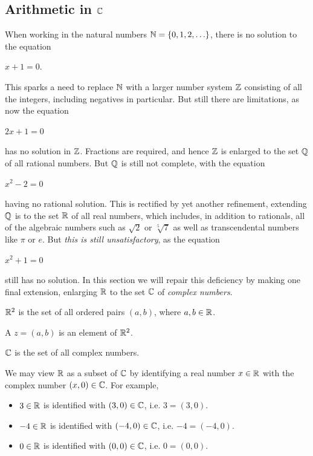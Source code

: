 \documentclass[11pt,fleqn,dvipsnames,usenames]{article}
\newcommand{\p}{\noindent}
\begin{document}
\subsection{Arithmetic in $\mathbb{C}$}

\p When working in the natural numbers $\mathbb{N} = \left\{0,1,2,\ldots\right\}$, there is no solution to the equation
\begin{center}
$x + 1 = 0$.
\end{center}
This sparks a need to replace $\mathbb{N}$ with a larger number system $\mathbb{Z}$ consisting of all the integers, including negatives in particular.  But still there are limitations, as now the equation
\begin{center}
$2x + 1 = 0$
\end{center}
has no solution in $\mathbb{Z}$.  Fractions are required, and hence $\mathbb{Z}$ is enlarged to the set $\mathbb{Q}$ of all rational numbers.  But $\mathbb{Q}$ is still not complete, with the equation
\begin{center}
$x^2 - 2 = 0$
\end{center}
having no rational solution.  This is rectified by yet another refinement, extending $\mathbb{Q}$ is to the set $\mathbb{R}$ of all real numbers, which includes, in addition to rationals, all of the algebraic numbers such as $\sqrt{2}$ or $\sqrt[5]{7}$ as well as transcendental numbers like $\pi$ or $e$.  But \emph{this is still unsatisfactory}, as the equation
\begin{center}
$x^2 + 1 = 0$
\end{center}
still has no solution.  In this section we will repair this deficiency by making one final extension, enlarging $\mathbb{R}$ to the set $\mathbb{C}$ of \emph{complex numbers}.
\vsp

\recall $\mathbb{R}^{2}$ is the set of all ordered pairs $(a,b)$, where $a,b\in\mathbb{R}$.

\begin{definition}
A  $z = (a,b)$ is an element of $\mathbb{R}^{2}$.
\end{definition}

\notation $\mathbb{C}$ is the set of all complex numbers.
\vsp

\begin{remark}
We may view $\mathbb{R}$ as a subset of $\mathbb{C}$ by identifying a real number $x\in\mathbb{R}$ with the complex number $(x,0)\in\mathbb{C}$.  For example,
\begin{itemize}
\item $3\in\mathbb{R}$ is identified with $(3,0)\in\mathbb{C}$, i.e. $3 = (3,0)$.
\item $-4\in\mathbb{R}$ is identified with $(-4,0)\in\mathbb{C}$, i.e. $-4 = (-4,0)$.
\item $0\in\mathbb{R}$ is identified with $(0,0)\in\mathbb{C}$, i.e. $0 = (0,0)$.
\end{itemize}
\end{remark}
\end{document}
